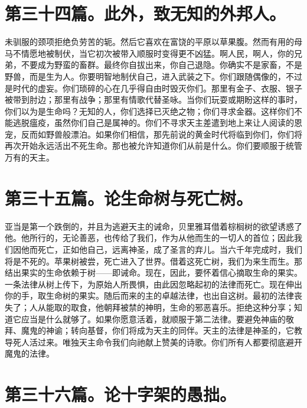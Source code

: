 \section{第三十四篇。此外，致无知的外邦人。}

未驯服的颈项拒绝负劳苦的轭。然后它喜欢在富饶的平原以草果腹。然而有用的母马不情愿地被制伏，当它初次被带入顺服时变得更不凶猛。啊人民，啊人，你的兄弟，不要成为野蛮的畜群。最终你自拔出来，你自己退隐。你确实不是家畜，不是野兽，而是生为人。你要明智地制伏自己，进入武装之下。你们跟随偶像的，不过是时代的虚妄。你们琐碎的心在几乎得自由时毁灭你们。那里有金子、衣服、银子被带到肘边；那里有战争；那里有情歌代替圣咏。当你们玩耍或期盼这样的事时，你们以为是生命吗？无知的人，你们选择已灭绝之物；你们寻求金器。这样你们不能逃脱瘟疫，虽然你们自己是属神的。你们不寻求天主差遣到地上来让人阅读的恩宠，反而如野兽般漂泊。如果你们相信，那先前说的黄金时代将临到你们，你们将再次开始永远活出不死生命。那也被允许知道你们从前是什么。你们要顺服于统管万有的天主。\par


\section{第三十五篇。论生命树与死亡树。}

亚当是第一个跌倒的，并且为逃避天主的诫命，贝里雅耳借着棕榈树的欲望诱惑了他。他所行的，无论善恶，也传给了我们，作为从他而生的一切人的首位；因此我们因他而死亡，正如他自己，远离神圣，成了圣言的弃儿。当六千年完成时，我们将是不死的。苹果树被尝，死亡进入了世界。借着这死亡树，我们为来生而生。那结出果实的生命依赖于树——即诫命。现在，因此，要怀着信心摘取生命的果实。一条法律从树上传下，为原始人所畏惧，由此因忽略起初的法律而死亡。现在伸出你的手，取生命树的果实。随后而来的主的卓越法律，也出自这树。最初的法律丧失了；人从能取的取食，他朝拜被禁的神明，生命的邪恶喜乐。拒绝这种分享；知道它应当是什么就够了。如果你愿意活着，就顺服于第二法律。要避免神庙的敬拜、魔鬼的神谕；转向基督，你们将成为天主的同伴。天主的法律是神圣的，它教导死人活过来。唯独天主命令我们向祂献上赞美的诗歌。你们所有人都要彻底避开魔鬼的法律。\par


\section{第三十六篇。论十字架的愚拙。}

